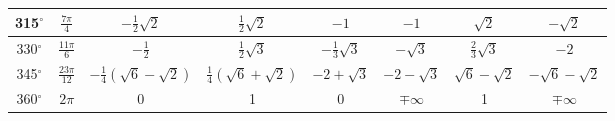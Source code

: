 \begin{table}[htb]
\begin{tabular}{|c|c|c|c|c|c|c|c|}
315$^{\circ}$ & $\frac{7\pi}{4}$ & $-\frac{1}{2}\sqrt{2}$ & $\frac{1}{2}\sqrt{2}$ & $-1$ & $-1$ & $\sqrt{2}$ & $-\sqrt{2}$ \\ \hline

330$^{\circ}$ & $\frac{11\pi}{6}$ & $-\frac{1}{2}$ & $\frac{1}{2}\sqrt{3}$ & $-\frac{1}{3}\sqrt{3}$ & $-\sqrt{3}$ & $\frac{2}{3}\sqrt{3}$ & $-2$ \\ \hline

345$^{\circ}$ & $\frac{23\pi}{12}$ & $-\frac{1}{4}\left(\sqrt{6}-\sqrt{2}\right)$ & $\frac{1}{4}\left(\sqrt{6}+\sqrt{2}\right)$ & $-2+\sqrt{3}$ & $-2-\sqrt{3}$ & $\sqrt{6}-\sqrt{2}$ & $-\sqrt{6}-\sqrt{2}$ \\ \hline

360$^{\circ}$ & $2\pi$ & 0 & 1 & 0 & $\mp \infty$ & 1 & $\mp \infty$ \\ \hline
\end{tabular}
\end{table}
\clearpage 

